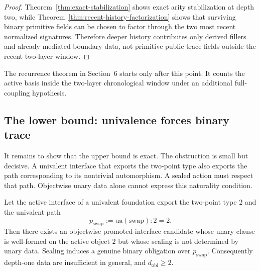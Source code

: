 \begin{proof}
Theorem~\ref{thm:exact-stabilization} shows exact arity stabilization at depth two, while
Theorem~\ref{thm:recent-history-factorization} shows that surviving binary primitive fields
can be chosen to factor through the two most recent normalized signatures.  Therefore deeper
history contributes only derived fillers and already mediated boundary data, not primitive
public trace fields outside the recent two-layer window.
\end{proof}

The recurrence theorem in Section~6 starts only after this point.  It counts the active basis
inside the two-layer chronological window under an additional full-coupling hypothesis.

\subsection{The lower bound: univalence forces binary trace}
\label{subsec:swap-lower-bound}

It remains to show that the upper bound is exact.  The obstruction is small but decisive.
A univalent interface that exports the two-point type also exports the path corresponding to
its nontrivial automorphism.  A sealed action must respect that path.  Objectwise unary data
alone cannot express this naturality condition.

\begin{theorem}
\label{thm:swap-obstruction}
Let the active interface of a univalent foundation export the two-point type \(2\) and the
univalent path
\[
  p_{\mathrm{swap}} := \mathrm{ua}(\mathrm{swap}) : 2 = 2.
\]
Then there exists an objectwise promoted-interface candidate whose unary clause is
well-formed on the active object \(2\) but whose sealing is not determined by unary data.
Sealing induces a genuine binary obligation over \(p_{\mathrm{swap}}\).  Consequently depth-one
data are insufficient in general, and \(d_{\mathrm{obl}}\geq 2\).
\end{theorem}

